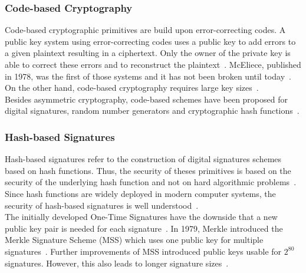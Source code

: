 \subsubsection{Code-based Cryptography}
Code-based cryptographic primitives are build upon error-correcting codes. A public key system using error-correcting codes uses a public key to add errors to a given plaintext resulting in a ciphertext. Only the owner of the private key is able to correct these errors and to reconstruct the plaintext~\parencite{bernstein2017post}. McEliece, published in 1978, was the first of those systems and it has not been broken until today~\parencite{mceliece1978public}. On the other hand, code-based cryptography requires large key sizes~\parencite{bernstein2017post}.\\
Besides asymmetric cryptography, code-based schemes have been proposed for digital signatures, random number generators and cryptographic hash functions~\parencite{bernstein2017post}.
\subsubsection{Hash-based Signatures}
Hash-based signatures refer to the construction of digital signatures schemes based on hash functions. Thus, the security of theses primitives is based on the security of the underlying hash function and not on hard algorithmic problems~\parencite{bernstein2017post}. Since hash functions are widely deployed in modern computer systems, the security of hash-based signatures is well understood~\parencite{chen2016report}.\\
The initially developed One-Time Signatures have the downside that a new public key pair is needed for each signature~\parencite{becker2008merkle}. In 1979, Merkle introduced the Merkle Signature Scheme (MSS) which uses one public key for multiple signatures~\parencite{merkle1979secrecy}. Further improvements of MSS introduced public keys usable for $2^{80}$ signatures. However, this also leads to longer signature sizes~\parencite{becker2008merkle}.

